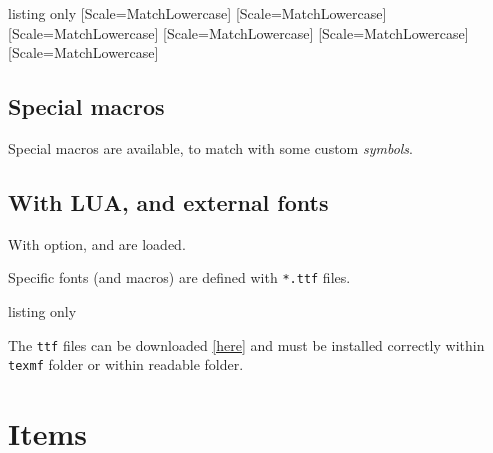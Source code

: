 \documentclass[11pt,a4paper]{ltxdoc}
\begin{document}
\begin{DemoCode}{listing only}
\newfontfamily{}[Scale=MatchLowercase] %
\newfontfamily{}[Scale=MatchLowercase] %
\newfontfamily{}[Scale=MatchLowercase] %
\newfontfamily{}[Scale=MatchLowercase] %
\newfontfamily{}[Scale=MatchLowercase] %
\newfontfamily{}[Scale=MatchLowercase] %
\end{DemoCode}

\subsection{Special macros}

Special macros are available, to match with some custom \textit{symbols}.

\begin{DemoCode}{}
\nwkstri \qquad \tidots  \qquad \casiodots
\end{DemoCode}

\subsection{With LUA, and external fonts}

With \ShowCode{[xelua]} option,  and  are loaded.

Specific fonts (and macros) are defined with \texttt{*.ttf} files.

\begin{DemoCode}{listing only}
\fontkeyNWKS       %
\fontkeyCASIOfx    %
\fontkeyCASIOcw    %
\fontkeyTIfr       %
\fontkeyTI         %
\end{DemoCode}

The \texttt{ttf} files can be downloaded \href{https://packages.cpierquet.fr/packages/graphiques/calculatoritems/calculatoritems_fonts.zip}{[here]} and must be installed correctly within \texttt{texmf} folder or within readable folder.

\pagebreak

\section{Items}
\end{document}
